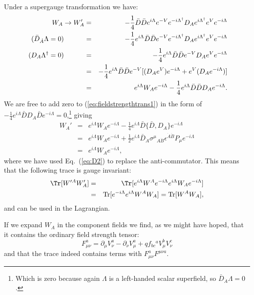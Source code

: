 \documentclass[notes.tex]{subfiles}
\begin{document}
Under a supergauge transformation we have:
\begin{eqnarray}
W_A \to W_A' &=& -\frac{1}{4}\bar{D}\bar{D}e^{i\Lambda}e^{-V}e^{-i\Lambda^\dagger}D_Ae^{i\Lambda^\dagger}e^{V}e^{-i\Lambda } \nonumber\\
 \text{ $(\bar{D}_{\dot{A}} \Lambda = 0)$\indent \indent}&=& -\frac{1}{4}e^{i\Lambda}\bar{D}\bar{D}e^{-V}e^{-i\Lambda^\dagger}D_Ae^{i\Lambda^\dagger}e^{V}e^{-i\Lambda } \nonumber\\
  \text{ $(D_{{A}} \Lambda^\dagger = 0)$\indent \indent}&=& -\frac{1}{4}e^{i\Lambda}\bar{D}\bar{D}e^{-V}D_Ae^{V}e^{-i\Lambda } \nonumber\\
&=& -\frac{1}{4}e^{i\Lambda}\bar{D}\bar{D}e^{-V}[(D_Ae^{V})e^{-i\Lambda } + e^V(D_Ae^{-i\Lambda})] \nonumber\\
&=& e^{i\Lambda}W_A e^{-i\Lambda}-\frac{1}{4}e^{i\Lambda}\bar{D}\bar{D}D_Ae^{-i\Lambda}.\label{eq:fieldstrengthtrans1}
\end{eqnarray}
We are free to add zero to (\ref{eq:fieldstrengthtrans1}) in the form of $-\frac{1}{4}e^{i\Lambda}\bar{D}D_A\bar{D}e^{-i\Lambda}=0$,\footnote{Which is zero because again $\Lambda$ is a left-handed scalar superfield, so $\bar{D}_{\dot{A}} \Lambda = 0$.} giving
\begin{eqnarray*}
W_A' &=& e^{i\Lambda}W_A e^{-i\Lambda}-\frac{1}{4}e^{i\Lambda}\bar{D}\{\bar{D},D_A\}e^{-i\Lambda}\\
&=& e^{i\Lambda}W_A e^{-i\Lambda}+\frac{1}{2}e^{i\Lambda}\bar{D}_{\dot{A}}\sigma^\mu{}_{A\dot{B}}\epsilon^{\dot{A}\dot{B}}P_\mu e^{-i\Lambda}\\
&=& e^{i\Lambda}W_A e^{-i\Lambda},
\end{eqnarray*}
where we have used Eq.~(\ref{eq:D2}) to replace the anti-commutator. This means that the following trace is gauge invariant:
\begin{eqnarray*}
\Tr[W'^AW'_A] &=& \Tr[e^{i\Lambda}W^A e^{-i\Lambda}e^{i\Lambda}W_A e^{-i\Lambda}]\\
&=& {\rm Tr}[e^{-i\Lambda}e^{i\Lambda}W^A W_A ] = {\rm Tr}[W^AW_A],
\end{eqnarray*}
and can be used in the Lagrangian.

If we expand $W_A$ in the component fields we find, as we might have hoped, that it contains the ordinary field strength tensor:
\[F_{\mu\nu}^a = \partial_\mu V^a_\nu - \partial_\nu V^{a}_{\mu} + qf_{bc}{}^aV_\mu^bV_\nu^c\]
and that the trace indeed contains terms with $F_{\mu\nu}^{a}F^{\mu\nu a}$.
\end{document}
